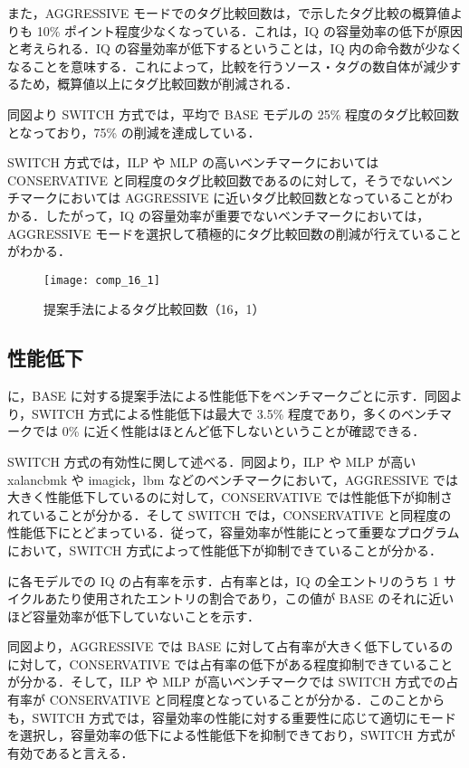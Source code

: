 また，AGGRESSIVE モードでのタグ比較回数は，で示したタグ比較の概算値よりも 10\% ポイント程度少なくなっている．これは，IQ の容量効率の低下が原因と考えられる．IQ の容量効率が低下するということは，IQ 内の命令数が少なくなることを意味する．これによって，比較を行うソース・タグの数自体が減少するため，概算値以上にタグ比較回数が削減される．

同図より SWITCH 方式では，平均で BASE モデルの 25\% 程度のタグ比較回数となっており，75\% の削減を達成している．

SWITCH 方式では，ILP や MLP の高いベンチマークにおいては CONSERVATIVE と同程度のタグ比較回数であるのに対して，そうでないベンチマークにおいては AGGRESSIVE に近いタグ比較回数となっていることがわかる．したがって，IQ の容量効率が重要でないベンチマークにおいては，AGGRESSIVE モードを選択して積極的にタグ比較回数の削減が行えていることがわかる．

\begin{figure}[htb]
  \centering
  \texttt{[image: comp\_16\_1]}
  \caption{提案手法によるタグ比較回数（16，1）}
  \label{fig:comp_16_1}
\end{figure}

\subsection{性能低下}
に，BASE に対する提案手法による性能低下をベンチマークごとに示す．同図より，SWITCH 方式による性能低下は最大で 3.5\% 程度であり，多くのベンチマークでは 0\% に近く性能はほとんど低下しないということが確認できる．

SWITCH 方式の有効性に関して述べる．同図より，ILP や MLP が高い xalancbmk や imagick，lbm などのベンチマークにおいて，AGGRESSIVE では大きく性能低下しているのに対して，CONSERVATIVE では性能低下が抑制されていることが分かる．そして SWITCH では，CONSERVATIVE と同程度の性能低下にとどまっている．従って，容量効率が性能にとって重要なプログラムにおいて，SWITCH 方式によって性能低下が抑制できていることが分かる．

に各モデルでの IQ の占有率を示す．占有率とは，IQ の全エントリのうち 1 サイクルあたり使用されたエントリの割合であり，この値が BASE のそれに近いほど容量効率が低下していないことを示す．

同図より，AGGRESSIVE では BASE に対して占有率が大きく低下しているのに対して，CONSERVATIVE では占有率の低下がある程度抑制できていることが分かる．そして，ILP や MLP が高いベンチマークでは SWITCH 方式での占有率が CONSERVATIVE と同程度となっていることが分かる．このことからも，SWITCH 方式では，容量効率の性能に対する重要性に応じて適切にモードを選択し，容量効率の低下による性能低下を抑制できており，SWITCH 方式が有効であると言える．

